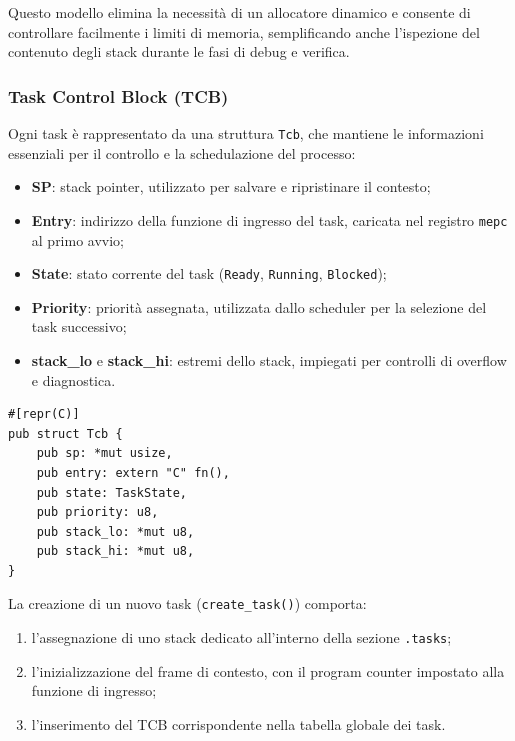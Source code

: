\documentclass[italian, Lau, oneside]{sapthesis} %
\begin{document}
Questo modello elimina la necessità di un allocatore dinamico e consente di controllare facilmente i limiti di memoria, semplificando anche l’ispezione del contenuto degli stack durante le fasi di debug e verifica.

\subsubsection*{Task Control Block (TCB)}

Ogni task è rappresentato da una struttura \texttt{Tcb}, che mantiene le informazioni essenziali per il controllo e la schedulazione del processo:

\begin{itemize}
    \item \textbf{SP}: stack pointer, utilizzato per salvare e ripristinare il contesto;
    \item \textbf{Entry}: indirizzo della funzione di ingresso del task, caricata nel registro \texttt{mepc} al primo avvio;
    \item \textbf{State}: stato corrente del task (\texttt{Ready}, \texttt{Running}, \texttt{Blocked});
    \item \textbf{Priority}: priorità assegnata, utilizzata dallo scheduler per la selezione del task successivo;
    \item \textbf{stack\_lo} e \textbf{stack\_hi}: estremi dello stack, impiegati per controlli di overflow e diagnostica.
\end{itemize}

\begin{center}
\begin{verbatim}
#[repr(C)]
pub struct Tcb {
    pub sp: *mut usize,
    pub entry: extern "C" fn(),
    pub state: TaskState,
    pub priority: u8,
    pub stack_lo: *mut u8,
    pub stack_hi: *mut u8,
}
\end{verbatim}
\end{center}

La creazione di un nuovo task (\texttt{create\_task()}) comporta:
\begin{enumerate}
    \item l’assegnazione di uno stack dedicato all’interno della sezione \texttt{.tasks};
    \item l’inizializzazione del frame di contesto, con il program counter impostato alla funzione di ingresso;
    \item l’inserimento del TCB corrispondente nella tabella globale dei task.
\end{enumerate}
\end{document}
